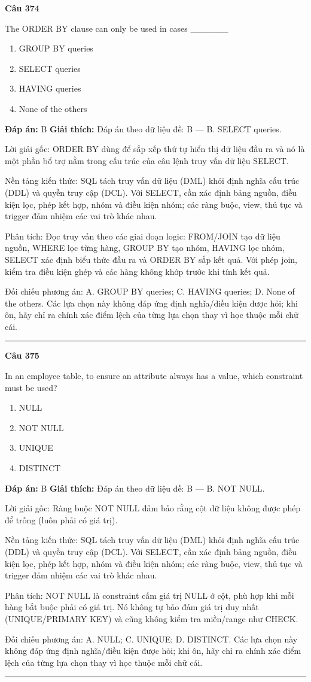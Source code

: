 \documentclass[11pt,a4paper]{article}
\newenvironment{question}[1]{%
  \par\vspace{1em}\noindent\textbf{\large Câu #1}\par\vspace{0.4em}
}{%
  \par\vspace{1em}\hrule\vspace{0.6em}
}
\newenvironment{choices}{%
  \begin{enumerate}[label=\textbf{\Alph*.},leftmargin=2.2em,itemsep=2pt,topsep=3pt]
}{%
  \end{enumerate}
}
\newcommand{\choice}{\item}
\begin{document}
\begin{question}{374}
The ORDER BY clause can only be used in cases ______
\begin{choices}
\choice GROUP BY queries
\choice SELECT queries
\choice HAVING queries
\choice None of the others
\end{choices}
\textbf{Đáp án:} B
\textbf{Giải thích:} Đáp án theo dữ liệu đề: B — B. SELECT queries.

Lời giải gốc: ORDER BY dùng để sắp xếp thứ tự hiển thị dữ liệu đầu ra và nó là một phần bổ trợ nằm trong cấu trúc của câu lệnh truy vấn dữ liệu SELECT.

Nền tảng kiến thức: SQL tách truy vấn dữ liệu (DML) khỏi định nghĩa cấu trúc (DDL) và quyền truy cập (DCL). Với SELECT, cần xác định bảng nguồn, điều kiện lọc, phép kết hợp, nhóm và điều kiện nhóm; các ràng buộc, view, thủ tục và trigger đảm nhiệm các vai trò khác nhau.

Phân tích: Đọc truy vấn theo các giai đoạn logic: FROM/JOIN tạo dữ liệu nguồn, WHERE lọc từng hàng, GROUP BY tạo nhóm, HAVING lọc nhóm, SELECT xác định biểu thức đầu ra và ORDER BY sắp kết quả. Với phép join, kiểm tra điều kiện ghép và các hàng không khớp trước khi tính kết quả.

Đối chiếu phương án: A. GROUP BY queries; C. HAVING queries; D. None of the others. Các lựa chọn này không đáp ứng định nghĩa/điều kiện được hỏi; khi ôn, hãy chỉ ra chính xác điểm lệch của từng lựa chọn thay vì học thuộc mỗi chữ cái.
\end{question}

\begin{question}{375}
In an employee table, to ensure an attribute always has a value, which constraint must be used?
\begin{choices}
\choice NULL
\choice NOT NULL
\choice UNIQUE
\choice DISTINCT
\end{choices}
\textbf{Đáp án:} B
\textbf{Giải thích:} Đáp án theo dữ liệu đề: B — B. NOT NULL.

Lời giải gốc: Ràng buộc NOT NULL đảm bảo rằng cột dữ liệu không được phép để trống (luôn phải có giá trị).

Nền tảng kiến thức: SQL tách truy vấn dữ liệu (DML) khỏi định nghĩa cấu trúc (DDL) và quyền truy cập (DCL). Với SELECT, cần xác định bảng nguồn, điều kiện lọc, phép kết hợp, nhóm và điều kiện nhóm; các ràng buộc, view, thủ tục và trigger đảm nhiệm các vai trò khác nhau.

Phân tích: NOT NULL là constraint cấm giá trị NULL ở cột, phù hợp khi mỗi hàng bắt buộc phải có giá trị. Nó không tự bảo đảm giá trị duy nhất (UNIQUE/PRIMARY KEY) và cũng không kiểm tra miền/range như CHECK.

Đối chiếu phương án: A. NULL; C. UNIQUE; D. DISTINCT. Các lựa chọn này không đáp ứng định nghĩa/điều kiện được hỏi; khi ôn, hãy chỉ ra chính xác điểm lệch của từng lựa chọn thay vì học thuộc mỗi chữ cái.
\end{question}
\end{document}
